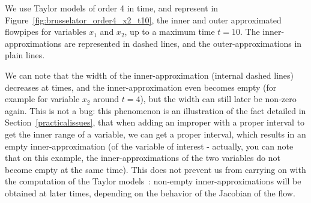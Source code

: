 \documentclass{sig-alternate-05-2015}
\begin{document}

 

We use Taylor models of order 4 in time, and represent  in Figure~\ref{fig:brusselator_order4_x2_t10}, the inner and outer approximated flowpipes for variables $x_1$ and $x_2$, up to a maximum time $t=10$. The inner-approximations are represented in dashed lines, and the outer-approximations in plain lines. 

We can note that the width of the inner-approximation (internal dashed lines) decreases at times, and the inner-approximation even becomes empty 
(for example for variable $x_2$ around $t=4$), but the width can still later be non-zero again. 
This is not a bug: this phenomenon is an illustration of the fact detailed in Section~\ref{practicalissues}, that when adding an improper with a proper interval to get the inner range of a variable, we can get a proper interval, which results in an empty inner-approximation (of the variable of interest - actually, you can note that on this example, the inner-approximations of the two variables do not become empty at the same time). 
This does not prevent us from carrying
on with the computation of the Taylor models~:   non-empty inner-approximations will be obtained at later times, 
depending on the behavior of the Jacobian of the flow.    
\end{document}

